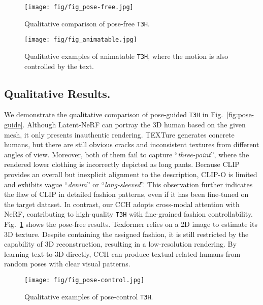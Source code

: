 \documentclass[11pt]{article}
\begin{document}
\begin{figure}[t]
\centering
    \texttt{[image: fig/fig\_pose-free.jpg]}
    \vspace{-0.5ex}
    \caption{Qualitative comparison of pose-free \texttt{T3H}.}
    \vspace{-3ex}
    \label{fig:pose-free}
\end{figure}

\begin{figure*}[t]
\centering
    \texttt{[image: fig/fig\_animatable.jpg]}
    \vspace{-3.5ex}
    \caption{Qualitative examples of animatable \texttt{T3H}, where the motion is also controlled by the text.}
    \vspace{-2ex}
    \label{fig:animatable}
\end{figure*}

\subsection{Qualitative Results.}
We demonstrate the qualitative comparison of pose-guided \texttt{T3H} in Fig.~\ref{fig:pose-guide}. Although Latent-NeRF can portray the 3D human based on the given mesh, it only presents inauthentic rendering. TEXTure generates concrete humans, but there are still obvious cracks and inconsistent textures from different angles of view. Moreover, both of them fail to capture ``\textit{three-point}'', where the rendered lower clothing is incorrectly depicted as long pants. Because CLIP provides an overall but inexplicit alignment to the description, CLIP-O is limited and exhibits vague ``\textit{denim}'' or ``\textit{long-sleeved}''. This observation further indicates the flaw of CLIP in detailed fashion patterns, even if it has been fine-tuned on the target dataset. In contrast, our CCH adopts cross-modal attention with NeRF, contributing to high-quality \texttt{T3H} with fine-grained fashion controllability. Fig.~\ref{fig:pose-free} shows the pose-free results. Texformer relies on a 2D image to estimate its 3D texture. Despite containing the assigned fashion, it is still restricted by the capability of 3D reconstruction, resulting in a low-resolution rendering. By learning text-to-3D directly, CCH can produce textual-related humans from random poses with clear visual patterns.

\begin{figure}[t]
\centering
    \texttt{[image: fig/fig\_pose-control.jpg]}
    \vspace{-1ex}
    \caption{Qualitative examples of pose-control \texttt{T3H}.}
    \vspace{-3ex}
    \label{fig:pose-control}
\end{figure}
\end{document}
